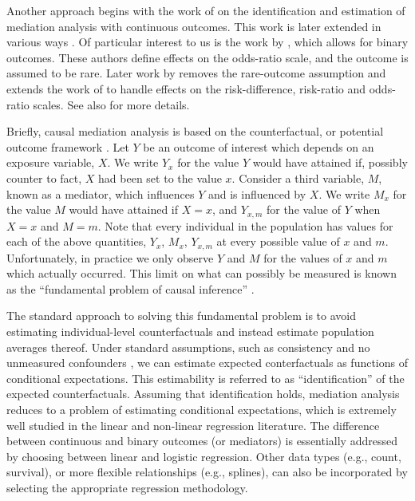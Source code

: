 \documentclass{article}
\begin{document}
Another approach begins with the work of \citet{Van09} on the identification and estimation of mediation analysis with continuous outcomes. This work is later extended in various ways \citep{Van10, Van13, Van14}. Of particular interest to us is the work by \citet{Van10}, which allows for binary outcomes. These authors define effects on the odds-ratio scale, and the outcome is assumed to be rare. Later work by \citet{Sam21} removes the rare-outcome assumption and extends the work of \citet{Van09} to handle effects on the risk-difference, risk-ratio and odds-ratio scales. See also \citet{Sam18,Sam23} for more details.

Briefly, causal mediation analysis is based on the counterfactual, or potential outcome framework \citep[see, e.g.,][]{Van09,Pea12}. Let $Y$ be an outcome of interest which depends on an exposure variable, $X$. We write $Y_x$ for the value $Y$ would have attained if, possibly counter to fact, $X$ had been set to the value $x$. Consider a third variable, $M$, known as a mediator, which influences $Y$ and is influenced by $X$. We write $M_x$ for the value $M$ would have attained if $X=x$, and $Y_{x,m}$ for the value of $Y$ when $X=x$ and $M=m$. Note that every individual in the population has values for each of the above quantities, $Y_x$, $M_x$, $Y_{x,m}$ at every possible value of $x$ and $m$. Unfortunately, in practice we only observe $Y$ and $M$ for the values of $x$ and $m$ which actually occurred. This limit on what can possibly be measured is known as the ``fundamental problem of causal inference'' \citep{Din18, Hol86}. 

The standard approach to solving this fundamental problem is to avoid estimating individual-level counterfactuals and instead estimate population averages thereof. Under standard assumptions, such as consistency and no unmeasured confounders \citep[see, e.g.,][]{Pea09}, we can estimate expected conterfactuals as functions of conditional expectations. This estimability is referred to as ``identification'' of the expected counterfactuals. Assuming that identification holds, mediation analysis reduces to a problem of estimating conditional expectations, which is extremely well studied in the linear and non-linear regression literature. The difference between continuous and binary outcomes (or mediators) is essentially addressed by choosing between linear and logistic regression. Other data types (e.g., count, survival), or more flexible relationships (e.g., splines), can also be incorporated by selecting the appropriate regression methodology.
\end{document}
